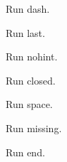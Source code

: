 \documentclass{article}
\begin{document}
Run dash.


Run last.


Run nohint.


Run closed.


Run space.

\ifdefined\PdfpagesMissing
Run missing.


\fi
Run end.
\end{document}
